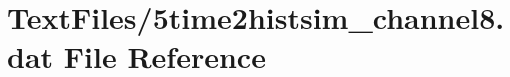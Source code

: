 \hypertarget{5time2histsim__channel8_8dat}{}\section{Text\+Files/5time2histsim\+\_\+channel8.dat File Reference}
\label{5time2histsim__channel8_8dat}
